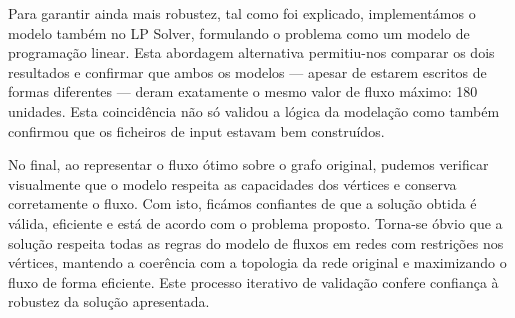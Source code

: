 \documentclass[a4paper,12pt]{article}
\begin{document}
\vspace{0.5em}

Para garantir ainda mais robustez, tal como foi explicado, implementámos o modelo também no LP Solver, formulando o problema como um modelo de programação linear. Esta abordagem alternativa permitiu-nos comparar os dois resultados e confirmar que ambos os modelos — apesar de estarem escritos de formas diferentes — deram exatamente o mesmo valor de fluxo máximo: 180 unidades. Esta coincidência não só validou a lógica da modelação como também confirmou que os ficheiros de input estavam bem construídos.

\vspace{0.5em}

No final, ao representar o fluxo ótimo sobre o grafo original, pudemos verificar visualmente que o modelo respeita as capacidades dos vértices e conserva corretamente o fluxo. Com isto, ficámos confiantes de que a solução obtida é válida, eficiente e está de acordo com o problema proposto. Torna-se óbvio que a solução respeita todas as regras do modelo de fluxos em redes com restrições nos vértices, mantendo a coerência com a topologia da rede original e maximizando o fluxo de forma eficiente. Este processo iterativo de validação confere confiança à robustez da solução apresentada.
\end{document}
